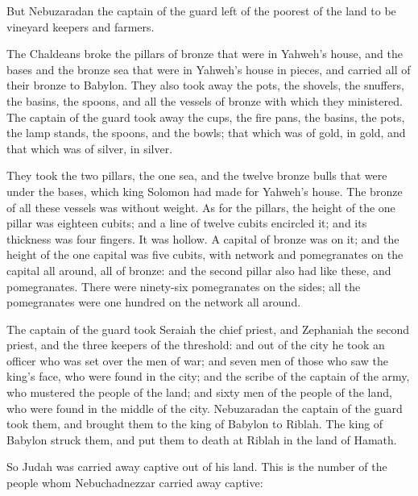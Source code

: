 {But Nebuzaradan the captain of the guard left of the poorest of the land to be vineyard keepers and farmers.
\par }{\PP {}The Chaldeans broke the pillars of bronze that were in Yahweh’s house, and the bases and the bronze sea that were in Yahweh’s house in pieces, and carried all of their bronze to Babylon.
They also took away the pots, the shovels, the snuffers, the basins, the spoons, and all the vessels of bronze with which they ministered.
The captain of the guard took away the cups, the fire pans, the basins, the pots, the lamp stands, the spoons, and the bowls; that which was of gold, in gold, and that which was of silver, in silver.
\par }{\PP {}They took the two pillars, the one sea, and the twelve bronze bulls that were under the bases, which king Solomon had made for Yahweh’s house. The bronze of all these vessels was without weight.
As for the pillars, the height of the one pillar was eighteen cubits; and a line of twelve cubits encircled it; and its thickness was four fingers. It was hollow.
A capital of bronze was on it; and the height of the one capital was five cubits, with network and pomegranates on the capital all around, all of bronze: and the second pillar also had like these, and pomegranates.
There were ninety-six pomegranates on the sides; all the pomegranates were one hundred on the network all around.
\par }{\PP {}The captain of the guard took Seraiah the chief priest, and Zephaniah the second priest, and the three keepers of the threshold:
and out of the city he took an officer who was set over the men of war; and seven men of those who saw the king’s face, who were found in the city; and the scribe of the captain of the army, who mustered the people of the land; and sixty men of the people of the land, who were found in the middle of the city.
Nebuzaradan the captain of the guard took them, and brought them to the king of Babylon to Riblah.
The king of Babylon struck them, and put them to death at Riblah in the land of Hamath.
\par }{\PP So Judah was carried away captive out of his land.
This is the number of the people whom Nebuchadnezzar carried away captive:
}
